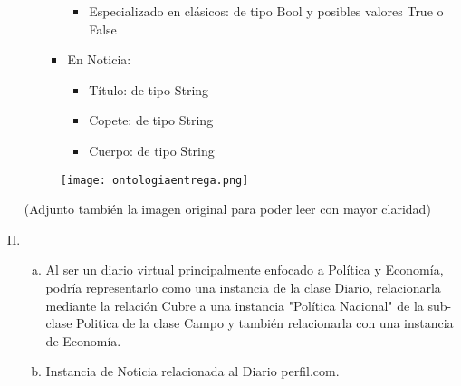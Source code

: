\documentclass[11pt]{article}
\begin{document}
\begin{enumerate}[I. ]
\begin{itemize}
\begin{itemize}
                  \begin{itemize}
                        \item Especializado en clásicos: de tipo Bool y posibles valores True o False
                  \end{itemize}
                  \item En Noticia:
                  \begin{itemize}
                        \item Título: de tipo String
                        \item Copete: de tipo String
                        \item Cuerpo: de tipo String
                  \end{itemize}
                  \end{itemize}
      \end{itemize}
      \begin{figure}[h!]
            \begin{center}
              \texttt{[image: ontologiaentrega.png]}
            \end{center}
          \end{figure}
(Adjunto también la imagen original para poder leer con mayor claridad)
      \item 
            \begin{enumerate}[a.]
                  \item Al ser un diario virtual principalmente enfocado a Política
                  y Economía, podría representarlo como una instancia de la clase
                  Diario, relacionarla mediante la relación Cubre a una instancia
                  "Política Nacional" de la sub-clase Politica de la clase Campo
                  y también relacionarla con una instancia de Economía. 
                  \item Instancia de Noticia relacionada al Diario perfil.com.
            \end{enumerate}

\end{enumerate}
\end{document}
